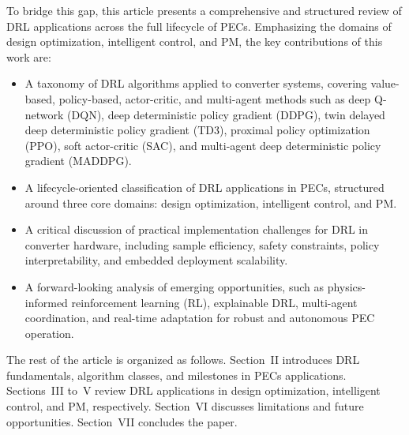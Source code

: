 To bridge this gap, this article presents a comprehensive and structured review of DRL applications across the full lifecycle of PECs. Emphasizing the domains of design optimization, intelligent control, and PM, the key contributions of this work are:

\begin{itemize}
  \item[1)] A taxonomy of DRL algorithms applied to converter systems, covering value-based, policy-based, actor-critic, and multi-agent methods such as deep Q-network (DQN), deep deterministic policy gradient (DDPG), twin delayed deep deterministic policy gradient (TD3), proximal policy optimization (PPO), soft actor-critic (SAC), and multi-agent deep deterministic policy gradient (MADDPG).
  \item[2)] A lifecycle-oriented classification of DRL applications in PECs, structured around three core domains: design optimization, intelligent control, and PM.
  \item[3)] A critical discussion of practical implementation challenges for DRL in converter hardware, including sample efficiency, safety constraints, policy interpretability, and embedded deployment scalability.
  \item[4)] A forward-looking analysis of emerging opportunities, such as physics-informed reinforcement learning (RL), explainable DRL, multi-agent coordination, and real-time adaptation for robust and autonomous PEC operation.
\end{itemize}

The rest of the article is organized as follows. Section~II introduces DRL fundamentals, algorithm classes, and milestones in PECs applications. Sections~III to~V review DRL applications in design optimization, intelligent control, and PM, respectively. Section~VI discusses limitations and future opportunities. Section~VII concludes the paper.



